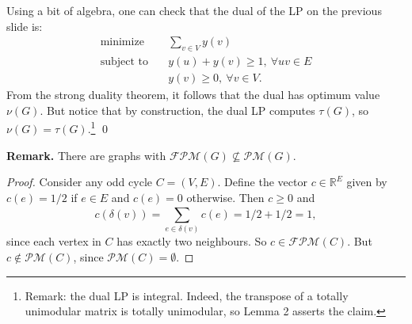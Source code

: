 \begin{frame}
Using a bit of algebra, one can check that the dual of the LP on the previous slide is:
\begin{align*}
\text{minimize} \quad & \sum_{v \in V}^{} y(v)  \\
\text{subject to} \quad & y(u) + y(v) \geq 1 , \ \forall uv \in E \\
& y(v) \geq 0, \ \forall v \in V.
\end{align*}
From the strong duality theorem, it follows that the dual has optimum value \( \nu (G) \). But notice that by construction, the dual LP computes \( \tau (G) \), so \( \nu (G) = \tau (G) \).\footnote{Remark: the dual LP is integral. Indeed, the transpose of a totally unimodular matrix is totally unimodular, so Lemma 2 asserts the claim.} \qed
\end{frame}

\begin{frame}
\textbf{Remark.} There are graphs with \(\mathcal{FPM} (G) \not\subseteq \mathcal{PM} (G) \).
\begin{proof}
Consider any odd cycle \( C = (V,E) \). Define the vector \( c \in \mathbb{R}^{E}  \) given by \( c(e) = 1/2 \) if \( e \in E \) and \( c(e) = 0 \) otherwise. Then \( c \geq 0 \) and \[ c(\delta (v)) = \sum_{e \in \delta (v)}^{} c(e) = 1/2 + 1/2 = 1,  \] since each vertex in \( C \) has exactly two neighbours. So \( c \in \mathcal{FPM} (C) \). But \( c \notin \mathcal{PM} (C) \), since \( \mathcal{PM} (C) = \emptyset   \).
\end{proof}
\end{frame}
